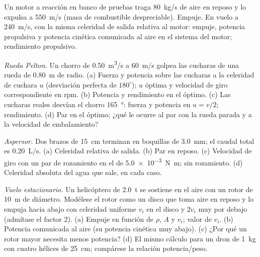 \begin{exercise}[$\star$]\label{exo:b2:flow-balances:4}
Un motor a reacción en banco de pruebas traga \qty{80}{kg/s} de aire en
reposo y lo expulsa a \qty{550}{m/s} (masa de combustible despreciable).
Empuje. En vuelo a \qty{240}{m/s}, con la misma celeridad de salida
relativa al motor: empuje, potencia propulsiva y potencia cinética
comunicada al aire en el sistema del motor; rendimiento propulsivo.
\end{exercise}

\begin{exercise}[$\star\star$]\label{exo:b2:flow-balances:5}
\emph{Rueda Pelton.} Un chorro de \qty{0.50}{m^3/s} a \qty{60}{m/s} golpea
las cucharas de una rueda de \qty{0.80}{m} de radio. (a) Fuerza y potencia
sobre las cucharas a la celeridad de cuchara $u$ (desviación perfecta de
$180^\circ$); $u$ óptima y velocidad de giro correspondiente en rpm.
(b) Potencia y rendimiento en el óptimo. (c) Las cucharas reales desvían
el chorro \qty{165}{\degree}: fuerza y potencia en $u = v/2$; rendimiento.
(d) Par en el óptimo; ¿qué le ocurre al par con la rueda parada y a la velocidad de embalamiento?
\end{exercise}

\begin{exercise}[$\star\star$]\label{exo:b2:flow-balances:6}
\emph{Aspersor.} Dos brazos de \qty{15}{cm} terminan en boquillas de
\qty{3.0}{mm}; el caudal total es \qty{0.20}{L/s}. (a) Celeridad relativa de
salida. (b) Par en reposo. (c) Velocidad de giro con un par de rozamiento
en el  de \qty{5.0e-3}{N.m};  sin rozamiento.
(d) Celeridad absoluta del agua que sale, en cada caso.
\end{exercise}

\begin{exercise}[$\star\star$]\label{exo:b2:flow-balances:7}
\emph{Vuelo estacionario.} Un helicóptero de \qty{2.0}{t} se sostiene en el
aire con un rotor de \qty{10}{m} de diámetro. Modélese el rotor como un
disco que toma aire en reposo y lo empuja hacia abajo con celeridad
uniforme $v_i$ en el disco y $2v_i$ muy por debajo (admítase el factor 2). (a) Empuje en función de $\rho$, $A$ y $v_i$;
valor de $v_i$. (b) Potencia comunicada al aire (su potencia cinética muy
abajo). (c) ¿Por qué un rotor mayor necesita menos potencia? (d) El mismo
cálculo para un dron de \qty{1}{kg} con cuatro hélices de \qty{25}{cm};
compárese la relación potencia/peso.
\end{exercise}

